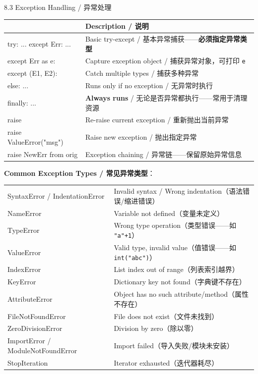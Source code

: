 \documentclass[11pt,a4paper]{report}
\let\oldtexttt\texttt
\renewcommand{\texttt}[1]{\textcolor{mainblue}{\oldtexttt{#1}}}
\begin{document}
\begin{cmdsection}{8.3  Exception Handling / 异常处理}
\normalsize\renewcommand{\arraystretch}{1.4}
\centering
\begin{tabularx}{\textwidth}{@{}>{\ttfamily}l>{\raggedright\arraybackslash}X@{}}
\toprule
\multicolumn{1}{@{}l}{\textbf{Syntax}} & \textbf{Description / 说明} \\ \midrule
try: ... except Err: ...    & Basic try-except / 基本异常捕获——\textbf{必须指定异常类型} \\
except Err as e:            & Capture exception object / 捕获异常对象，可打印 \texttt{e} \\
except (E1, E2):            & Catch multiple types / 捕获多种异常 \\
else: ...                   & Runs only if no exception / 无异常时执行 \\
finally: ...                & \textbf{Always runs} / 无论是否异常都执行——常用于清理资源 \\
raise                       & Re-raise current exception / 重新抛出当前异常 \\
raise ValueError("msg")     & Raise new exception / 抛出指定异常 \\
raise NewErr from orig      & Exception chaining / 异常链——保留原始异常信息 \\
\bottomrule
\end{tabularx}
\medskip
\textbf{Common Exception Types / 常见异常类型}：
\small
\begin{tabularx}{\textwidth}{@{}>{\ttfamily}l>{\raggedright\arraybackslash}X@{}}
SyntaxError / IndentationError & Invalid syntax / Wrong indentation（语法错误/缩进错误） \\
NameError                   & Variable not defined（变量未定义） \\
TypeError                   & Wrong type operation（类型错误——如 \texttt{"a"+1}） \\
ValueError                  & Valid type, invalid value（值错误——如 \texttt{int("abc")}） \\
IndexError                  & List index out of range（列表索引越界） \\
KeyError                    & Dictionary key not found（字典键不存在） \\
AttributeError              & Object has no such attribute/method（属性不存在） \\
FileNotFoundError           & File does not exist（文件未找到） \\
ZeroDivisionError           & Division by zero（除以零） \\
ImportError / ModuleNotFoundError & Import failed（导入失败/模块未安装） \\
StopIteration               & Iterator exhausted（迭代器耗尽） \\
\end{tabularx}
\normalsize
\end{cmdsection}
\end{document}
